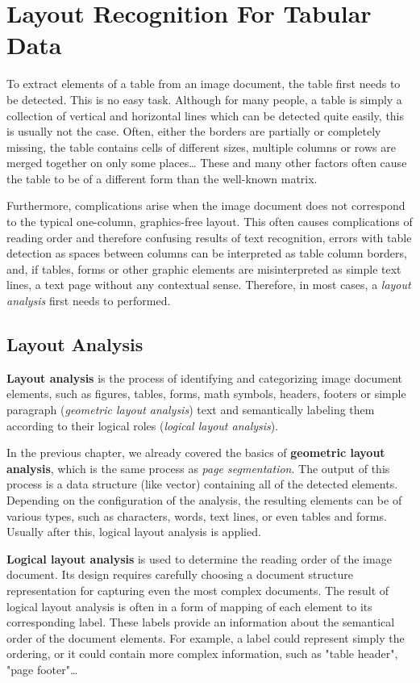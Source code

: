 \chapter{Layout Recognition For Tabular Data}

To extract elements of a table from an image document, the table first needs to be detected. This is no easy task.  Although for many people, a table is simply a collection of vertical and horizontal lines which can be detected quite easily, this is usually not the case. Often, either the borders are partially or completely missing, the table contains cells of different sizes, multiple columns or rows are merged together on only some places… These and many other factors often cause the table to be of a different form than the well-known matrix. 

Furthermore, complications arise when the image document does not correspond to the typical one-column, graphics-free layout. This often causes complications of reading order and therefore confusing results of text recognition, errors with table detection as spaces between columns can be interpreted as table column borders, and, if tables, forms or other graphic elements are misinterpreted as simple text lines, a text page without any contextual sense. Therefore, in most cases, a \emph{layout analysis} first needs to performed.

\section{Layout Analysis}

\textbf{Layout analysis} is the process of identifying and categorizing image document elements, such as figures, tables, forms, math symbols, headers, footers or simple paragraph (\emph{geometric layout analysis}) text and semantically labeling them according to their logical roles (\emph{logical layout analysis}).

In the previous chapter, we already covered the basics of \textbf{geometric layout analysis}, which is the same process as \emph{page segmentation}. The output of this process is a data structure (like vector) containing all of the detected elements. Depending on the configuration of the analysis, the resulting elements can be of various types, such as characters, words, text lines, or even tables and forms. Usually after this, logical layout analysis is applied.

\textbf{Logical layout analysis }is used to determine the reading order of the image document. Its design requires carefully choosing a document structure representation for capturing even the most complex documents. The result of logical layout analysis is often in a form of mapping of each element to its corresponding label. These labels provide an information about the semantical order of the document elements. For example, a label could represent simply the ordering, or it could contain more complex information, such as "table header", "page footer"\ldots

